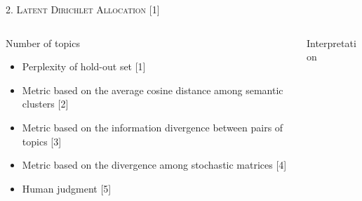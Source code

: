 \documentclass[fleqn,final]{beamer}
\begin{document}
\begin{frame}
\begin{columns}[t]
\begin{column}{.50\linewidth}
\begin{block}{\rule[-2.5mm]{0cm}{1cm}\textsc{2. Latent Dirichlet Allocation [1]}}

\begin{columns}[t]
\begin{column}{.47\linewidth}
{\small 
\vspace{-1.3cm}	
\begin{block}{\small{Number of topics}}
\vspace{0.2cm}	
{\color{blue}{Methods to derive the appropriate number of topics:}}
\begin{itemize}
    \item Perplexity of hold-out set [1]
    \item Metric based on the average cosine distance among semantic clusters [2]
    \item Metric based on the information divergence between pairs of topics [3]
    \item Metric based on the divergence among stochastic matrices [4]
    \item Human judgment [5]
\end{itemize}

\end{block}
}
\end{column}			

\begin{column}{.47\linewidth}
{\small 			
\vspace{-1.3cm}	
\begin{block}{\small{Interpretation}}


\end{block}
}
\end{column}

\end{columns}

\end{block}	




\end{column}
\end{columns}
\end{frame}
\end{document}
